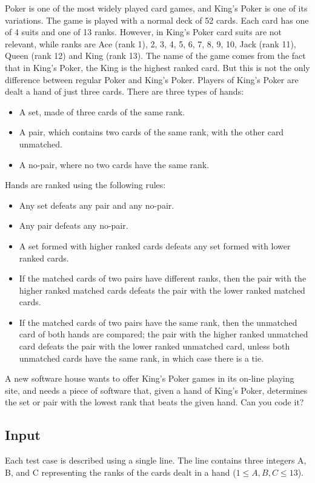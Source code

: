Poker is one of the most widely played card games, and King's Poker is one
of its variations. The game is played with a normal deck of 52 cards. Each
card has one of 4 suits and one of 13 ranks. However, in King's Poker card
suits are not relevant, while ranks are Ace (rank 1), 2, 3, 4, 5, 6, 7, 8,
9, 10, Jack (rank 11), Queen (rank 12) and King (rank 13). The name of the
game comes from the fact that in King's Poker, the King is the highest
ranked card. But this is not the only difference between regular Poker and
King's Poker. Players of King's Poker are dealt a hand of just three cards.
There are three types of hands:

\begin{itemize}
\item A set, made of three cards of the same rank.
\item A pair, which contains two cards of the same rank, with the other card
unmatched.
\item A no-pair, where no two cards have the same rank.
\end{itemize}

Hands are ranked using the following rules:
\begin{itemize}
\item Any set defeats any pair and any no-pair.
\item Any pair defeats any no-pair.
\item A set formed with higher ranked cards defeats any set formed with
lower ranked cards.
\item If the matched cards of two pairs have different ranks, then the pair
with the higher ranked matched cards defeats the pair with the lower ranked
matched cards.
\item If the matched cards of two pairs have the same rank, then the
unmatched card of both hands are compared; the pair with the higher ranked
unmatched card defeats the pair with the lower ranked unmatched card, unless
both unmatched cards have the same rank, in which case there is a tie.
\end{itemize}

A new software house wants to offer King's Poker games in its on-line
playing site, and needs a piece of software that, given a hand of King's
Poker, determines the set or pair with the lowest rank that beats the given
hand. Can you code it?

\subsection*{Input}
Each test case is described using a single line. The line contains three
integers A, B, and C representing the ranks of the cards dealt in a hand ($1
\le A, B, C \le 13$).

